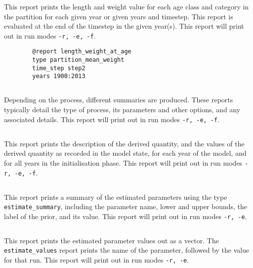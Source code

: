 This report prints the length and weight value for each age class and category in the partition for each given year or given years and timestep. This report is evaluated at the end of the timestep in the given year(s). This report will print out in run modes \texttt{-r, -e, -f}.

\begin{verbatim}
		@report length_weight_at_age
		type partition_mean_weight
		time_step step2
		years 1900:2013
\end{verbatim}

\subsection{}

Depending on the process, different summaries are produced. These reports typically detail the type of process, its parameters and other options, and any associated details. This report will print out in run modes \texttt{-r, -e, -f}.

\subsection{}

This report prints the description of the derived quantity, and the values of the derived quantity as recorded in the model state, for each year of the model, and for all years in the initialisation phase. This report will print out in run modes \texttt{-r, -e, -f}.

\subsection{}

This report prints a summary of the estimated parameters using the type \texttt{estimate\_summary}, including the parameter name, lower and upper bounds, the label of the prior, and its value. This report will print out in run modes \texttt{-r, -e}.

\subsection{}

This report prints the estimated parameter values out as a vector. The \texttt{estimate\_values} report prints the name of the parameter, followed by the value for that run. This report will print out in run modes \texttt{-r, -e}.

